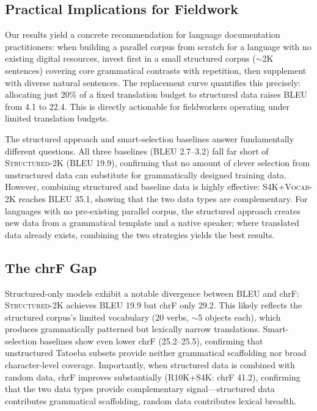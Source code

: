 \documentclass[11pt]{article}
\begin{document}
\subsection{Practical Implications for Fieldwork}

Our results yield a concrete recommendation for language documentation practitioners: when building a parallel corpus from scratch for a language with no existing digital resources, invest first in a small structured corpus (${\sim}$2K sentences) covering core grammatical contrasts with repetition, then supplement with diverse natural sentences. The replacement curve quantifies this precisely: allocating just 20\% of a fixed translation budget to structured data raises BLEU from 4.1 to 22.4. This is directly actionable for fieldworkers operating under limited translation budgets.

The structured approach and smart-selection baselines answer fundamentally different questions. All three baselines (BLEU 2.7--3.2) fall far short of \textsc{Structured-2K} (BLEU 19.9), confirming that no amount of clever selection from unstructured data can substitute for grammatically designed training data. However, combining structured and baseline data is highly effective: \textsc{S4K+Vocab-2K} reaches BLEU 35.1, showing that the two data types are complementary. For languages with no pre-existing parallel corpus, the structured approach creates new data from a grammatical template and a native speaker; where translated data already exists, combining the two strategies yields the best results.

\subsection{The chrF Gap}

Structured-only models exhibit a notable divergence between BLEU and chrF: \textsc{Structured-2K} achieves BLEU 19.9 but chrF only 29.2. This likely reflects the structured corpus's limited vocabulary (20 verbs, ${\sim}$5 objects each), which produces grammatically patterned but lexically narrow translations. Smart-selection baselines show even lower chrF (25.2--25.5), confirming that unstructured Tatoeba subsets provide neither grammatical scaffolding nor broad character-level coverage. Importantly, when structured data is combined with random data, chrF improves substantially (\textsc{R10K+S4K}: chrF 41.2), confirming that the two data types provide complementary signal---structured data contributes grammatical scaffolding, random data contributes lexical breadth.
\end{document}
